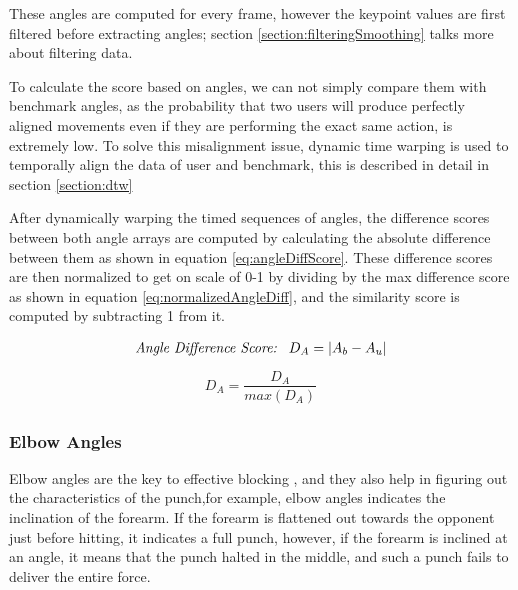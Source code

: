 These angles are computed for every frame, however the keypoint values are first filtered before extracting angles; section \ref{section:filteringSmoothing} talks more about filtering data. 

To calculate the score based on angles, we can not simply compare them with benchmark angles, as the probability that two users will produce perfectly aligned movements even if they are performing the exact same action, is extremely low. To solve this misalignment issue, dynamic time warping is used to temporally align the data of user and benchmark, this is described in detail in section \ref{section:dtw}

After dynamically warping the timed sequences of angles, the difference scores between both angle arrays are computed by calculating the absolute difference between them as shown in equation \ref{eq:angleDiffScore}. 
These difference scores are then normalized to get on scale of 0-1 by dividing by the max difference score as shown in equation \ref{eq:normalizedAngleDiff}, and the similarity score is computed by subtracting 1 from it. 

\begin{align}
  \textit{Angle Difference Score:} \hspace{0.3cm} D_A = |A_{b} - A_{u}|
  \label{eq:angleDiffScore}
\end{align}
\begin{align}
  D_A = \dfrac{D_A}{max(D_A)}
  \label{eq:normalizedAngleDiff}
\end{align}

\subsubsection{Elbow Angles}
Elbow angles are the key to effective blocking \cite{Karate}, and they also help in figuring out the characteristics of the punch,for example, elbow angles indicates the inclination of the forearm. If the forearm is flattened out towards the opponent just before hitting, it indicates a full punch, however, if the forearm is inclined at an angle, it means that the punch halted in the middle, and such a punch fails to deliver the entire force. 

